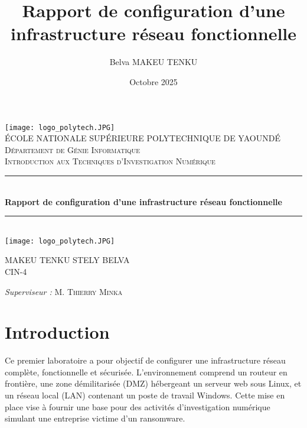 \documentclass[a4paper,12pt]{report}
\title{Rapport de configuration d'une infrastructure réseau fonctionnelle}
\author{Belva MAKEU TENKU}
\date{Octobre 2025}
\newcommand{\HRule}{\rule{\linewidth}{0.5mm}}
\begin{document}
\begin{titlepage}
	\begin{sffamily}
		\begin{center}
			\texttt{[image: logo\_polytech.JPG]}~\\[1.5cm]
			\textsc{\LARGE ÉCOLE NATIONALE SUPÉRIEURE POLYTECHNIQUE DE YAOUNDÉ}\\[2cm]
			\textsc{\Large Département de Génie Informatique}\\[2cm]
			\textsc{\large Introduction aux Techniques d'Investigation Numérique}\\[1.5cm]
			\HRule \\[0.4cm]
			{ \huge \bfseries Rapport de configuration d'une infrastructure réseau fonctionnelle\\[0.4cm] }
			\HRule \\[2cm]
			\texttt{[image: logo\_polytech.JPG]} \\[2cm]
			\begin{minipage}{0.4\textwidth}
				\begin{flushleft} \large
					MAKEU TENKU STELY BELVA\\
					CIN-4\\
				\end{flushleft}
			\end{minipage}
			\begin{minipage}{0.4\textwidth}
				\begin{flushright} \large
					\emph{Superviseur :} M. \textsc{Thierry Minka}\\
				\end{flushright}
			\end{minipage}
			\vfill
		\end{center}
	\end{sffamily}
\end{titlepage}
\tableofcontents
\newpage

\chapter*{Introduction}
Ce premier laboratoire a pour objectif de configurer une infrastructure réseau complète, fonctionnelle et sécurisée. 
L’environnement comprend un routeur en frontière, une zone démilitarisée (DMZ) hébergeant un serveur web sous Linux, et un réseau local (LAN) 
contenant un poste de travail Windows. Cette mise en place vise à fournir une base pour des activités d’investigation numérique simulant une entreprise victime d’un ransomware.
\end{document}
